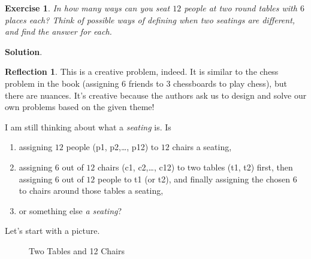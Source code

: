 \documentclass[11pt]{book}
\theoremstyle{definition}
\theoremstyle{plain}
\newtheorem{exercise}{Exercise}
\theoremstyle{definition}
\theoremstyle{problemstyle}
\theoremstyle{remark}
\theoremstyle{definition}
\newtheorem{reflection}{Reflection}
\begin{document}
\begin{exercise}
    \label{ex:1.8.8}
    In how many ways can you seat $12$ people at two round tables with $6$ places each? Think of possible ways of defining when two seatings are different, and find the answer for each.
\end{exercise}
\textbf{Solution}.
\begin{reflection}
    This is a creative problem, indeed. It is similar to the chess problem in the book (assigning 6 friends to 3 chessboards to play chess), but there are nuances. It's creative because the authors ask us to design and solve our own problems based on the given theme!

    I am still thinking about what a \emph{seating} is. Is 
    \begin{enumerate}[label=\arabic*)]
        \item assigning $12$ people (p1, p2,\dots, p12) to $12$ chairs a seating,
        \item assigning $6$ out of $12$ chairs (c1, c2,\dots, c12) to two tables (t1, t2) first, then assigning $6$ out of $12$ people to t1 (or t2), and finally assigning the chosen $6$ to chairs around those tables a seating, 
        \item or something else \emph{a seating}?
    \end{enumerate}

    Let's start with a picture.
    
\end{reflection}
\begin{figure}[H]
  \centering
  \caption{Two Tables and 12 Chairs}
  \label{fig:2t6c}
\end{figure}
\end{document}
